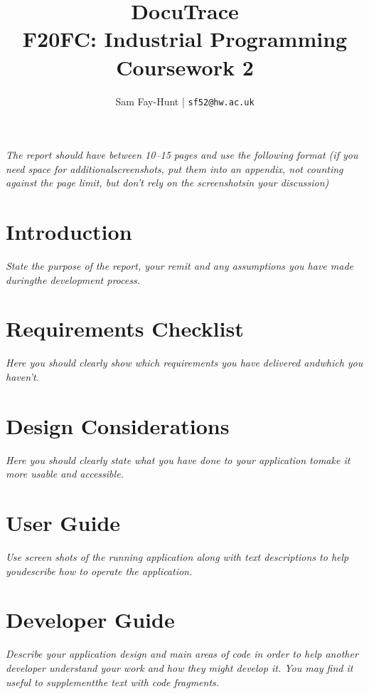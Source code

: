 \documentclass[11pt]{article}
\begin{document}
\title{%
	\bf DocuTrace\\ 
    \large F20FC: Industrial Programming\\
    Coursework 2}

\author{
	Sam Fay-Hunt | \texttt{sf52@hw.ac.uk}
}

\maketitle
\thispagestyle{empty}
\pagebreak


\tableofcontents
\thispagestyle{empty}
\pagebreak


\setcounter{page}{1}

\emph{The report should have between 10–15 pages and use the following format (if you need space for additionalscreenshots, put them into an appendix, not counting against the page limit, but don’t rely on the screenshotsin your discussion)}

\section{Introduction}
\emph{State the purpose of the report, your remit and any assumptions you have made duringthe development process.}

\section{Requirements Checklist}
\emph{Here you should clearly show which requirements you have delivered andwhich you haven’t.}

\section{Design Considerations}
\emph{Here you should clearly state what you have done to your application tomake it more usable and accessible.}

\section{User Guide}
\emph{Use screen shots of the running application along with text descriptions to help youdescribe how to operate the application.}

\section{Developer Guide}
\emph{Describe your application design and main areas of code in order to help another developer understand your work and how they might develop it. You may find it useful to supplementthe text with code fragments.}
\end{document}
